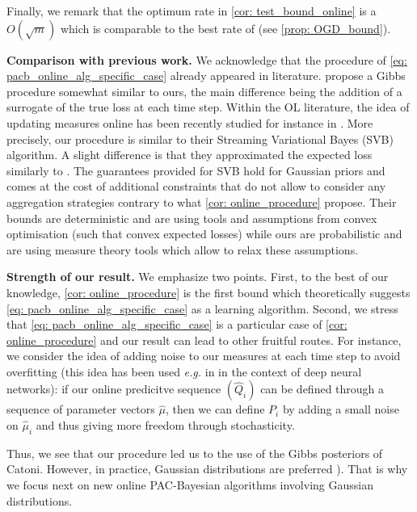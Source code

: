 Finally, we remark that the optimum rate in \cref{cor: test_bound_online} is a $O(\sqrt{m})$ which is comparable to the best rate of \citet[][Eq (2.5)]{shalev2012online} (see \cref{prop: OGD_bound}).



\textbf{Comparison with previous work.} We acknowledge that the procedure of \cref{eq: pacb_online_alg_specific_case} already appeared in literature. \citet[][Alg. 1]{li2018pac} propose a Gibbs procedure somewhat similar to ours, the main difference being the addition of a surrogate of the true loss at each time step.
Within the OL literature, the idea of updating measures online has been recently studied for instance in \citet{cherief2019generalization}. More precisely, our procedure is similar to their Streaming Variational Bayes (SVB) algorithm. A slight difference is that they approximated the expected loss similarly to \citet{shalev2012online}.
The guarantees \citet{cherief2019generalization} provided for SVB hold for Gaussian priors and comes at the cost of additional constraints that do not allow to consider any aggregation strategies contrary to what \cref{cor: online_procedure} propose. Their bounds are deterministic and are using tools and assumptions from convex optimisation (such that convex expected losses) while ours are probabilistic and are using measure theory tools which allow to relax these assumptions.

\textbf{Strength of our result.} We emphasize two points. First, to the best of our knowledge, \cref{cor: online_procedure} is the first bound which theoretically suggests \cref{eq: pacb_online_alg_specific_case} as a learning algorithm.
Second, we stress that \cref{eq: pacb_online_alg_specific_case}
is a particular case of \cref{cor: online_procedure} and our result can lead to other fruitful routes. For instance, we consider the idea of adding noise to our measures at each time step to avoid overfitting (this idea has been used \emph{e.g.} in \citealp{neelakantan2015adding} in the context of deep neural networks): if our online predicitve sequence $(\hat{Q}_i)$ can be defined through a sequence of parameter vectors $\hat{\mu}$, then we can define $P_i$ by adding a small noise on $\hat{\mu}_i$ and thus giving more freedom through stochasticity.

Thus, we see that our procedure led us to the use of the Gibbs posteriors of Catoni. However, in practice, Gaussian distributions are preferred \citep[\emph{e.g.}][]{dziugaite2017computing, rivasplata2019pac,perez2021progress,perezortiz2021learning,perez2021tighter}).
That is why we focus next on new online PAC-Bayesian algorithms involving Gaussian distributions.


